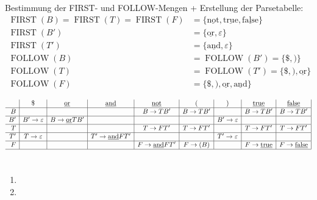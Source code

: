 \documentclass[a4paper,10pt]{scrartcl}
\newcommand{\FIRST}{\operatorname{FIRST}}
\newcommand{\FOLLOW}{\operatorname{FOLLOW}}
\begin{document}
Bestimmung der FIRST- und FOLLOW-Mengen + Erstellung der Parsetabelle:
\begin{align*}
 \FIRST(B) = \FIRST(T) = \FIRST(F) &= \{\underline{\textrm{not}}, \underline{\textrm{true}}, \underline{\textrm{false}}\} \\
 \FIRST(B') &= \{\underline{\textrm{or}}, \varepsilon\} \\
 \FIRST(T') &= \{\underline{\textrm{and}}, \varepsilon\} \\\hline
 \FOLLOW(B) &= \FOLLOW(B') = \{\$, )\}\\
 \FOLLOW(T) &= \FOLLOW(T') = \{\$, ), \underline{\textrm{or}}\}\\
 \FOLLOW(F) &= \{\$, ), \underline{\textrm{or}}, \underline{\textrm{and}}\}
\end{align*}
    \renewcommand{\not}{\underline{\textrm{not}}}
    \newcommand{\true}{\underline{\textrm{true}}}
    \newcommand{\false}{\underline{\textrm{false}}}
    \newcommand{\e}{\varepsilon}
\begin{center}
    $\begin{array}{r|c|c|c|c|c|c|c|c|}
           & \$        & \underline{\textrm{or}}           & \underline{\textrm{and}}            & \not            & (         & )         & \true       & \false     \\\hline
        B  &           &               &                 & B \to TB'       & B \to TB' &           & B \to TB'   & B \to TB'  \\\hline
        B' & B' \to \e & B \to \underline{\textrm{or}} TB' &                 &                 &           & B' \to \e &             &            \\\hline
        T  &           &               &                 & T \to FT'       & T \to FT' &           & T \to FT'   & T \to FT'  \\\hline
        T' & T \to \e  &               & T' \to \underline{\textrm{and}} FT' &                 &           & T' \to \e &             &            \\\hline
        F  &           &               &                 & F \to \underline{\textrm{and}} FT'  & F \to (B) &           & F \to \true & F \to \false \\\hline 
    \end{array}$
\end{center}



\section{}

\section{}
\begin{enumerate}
 \item 
 \item   
\end{enumerate}
\end{document}
